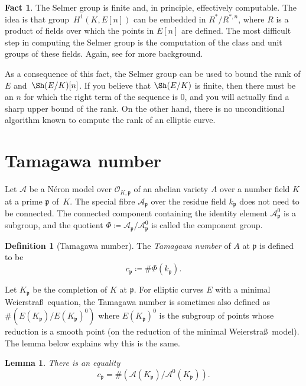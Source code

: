\documentclass[12pt]{article}
\newtheorem{lemma}[theorem]{Lemma}
\theoremstyle{definition}
\newtheorem{definition}[theorem]{Definition}
\newtheorem{fact}[theorem]{Fact}
\numberwithin{equation}{subsection}
\begin{document}
\begin{fact}
The Selmer group is finite and, in principle, effectively computable.
The idea is that group~$H^1(K,E[n])$ can be embedded in $R^* / R^{*,n}$, where $R$ is a product of fields over which the points in $E[n]$ are defined.
The most difficult step in computing the Selmer group is the computation of the class and unit groups of these fields. Again, see \cite{descent} for more background.

As a consequence of this fact, the Selmer group can be used to bound the rank of $E$ and~$\Sh(E/K)[n]$.
If you believe that $\Sh(E/K)$ is finite, then there must be an $n$ for which the right term of the sequence is 0, and you will actually find a sharp upper bound of the rank.
On the other hand, there is no unconditional algorithm known to compute the rank of an elliptic curve.
\end{fact}

\section{Tamagawa number}

Let $\mathcal{A}$ be a N\'eron model over $\mathcal{O}_{K,\mathfrak{p}}$ of an abelian variety $A$ over a number field $K$ at a prime $\mathfrak{p}$ of~$K$.
The special fibre $\mathcal{A}_{\mathfrak{p}}$ over the residue field $k_\mathfrak{p}$ does not need to be connected.
The connected component containing the identity element $\mathcal{A}_\mathfrak{p}^0$ is a subgroup, and the quotient $\Phi \coloneqq \mathcal{A}_{\mathfrak{p}} / \mathcal{A}_\mathfrak{p}^0$ is called the component group.

\begin{definition}[Tamagawa number]
The {\em Tamagawa number} of $A$ at $\mathfrak{p}$ is defined to be $$c_{\mathfrak{p}} \coloneqq \#\Phi(k_\mathfrak{p}).$$
\end{definition}

Let $K_\mathfrak{p}$ be the completion of $K$ at $\mathfrak{p}$.
For elliptic curves $E$ with a minimal Weierstra\ss\ equation, the Tamagawa number is sometimes also defined as $\# (E(K_\mathfrak{p}) / E(K_\mathfrak{p})^0)$ where $E(K_\mathfrak{p})^0$ is the subgroup of points whose reduction is a smooth point (on the reduction of the minimal Weierstra\ss\ model).
The lemma below explains why this is the same.

\begin{lemma}
There is an equality $$c_\mathfrak{p} = \#\!\left( \mathcal{A}(K_\mathfrak{p}) / \mathcal{A}^0(K_\mathfrak{p})\right).$$
\end{lemma}
\end{document}

